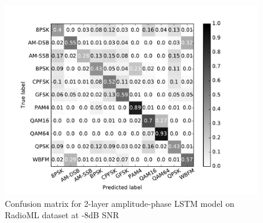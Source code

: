 \begin{figure}[htb]
\centering
\squeezeup
\includegraphics[width=1.1\columnwidth]{figures/confmat_-8.pdf}
\caption{Confusion matrix for 2-layer amplitude-phase LSTM model on RadioML dataset at -8dB SNR} 
\label{fig_confmat_-8}
\end{figure}

